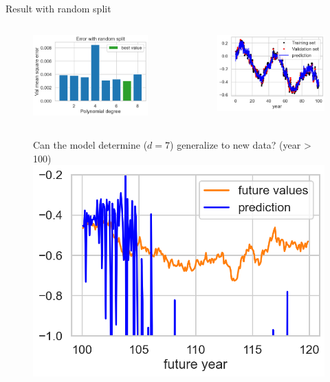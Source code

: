 \documentclass[handout, 10pt]{beamer}
\begin{document}
\begin{frame}{Result with random split}
\begin{columns}
   \begin{figure}
    \includegraphics[width=.9\textwidth]{presentation/course-2/figs/leak_bar_random.png}
    \end{figure}
    
   \begin{figure}
    \includegraphics[width=.9\textwidth]{presentation/course-2/figs/leak_ts_random.png}
    \end{figure}
\end{columns}

   \begin{figure}
   \centering
   Can the model determine ($d=7$) generalize to new data? (year > 100)\\
   \pause
    \includegraphics[width=.5\textwidth]{presentation/course-2/figs/leak_test_random.png}
    \end{figure}
\end{frame}
\end{document}
